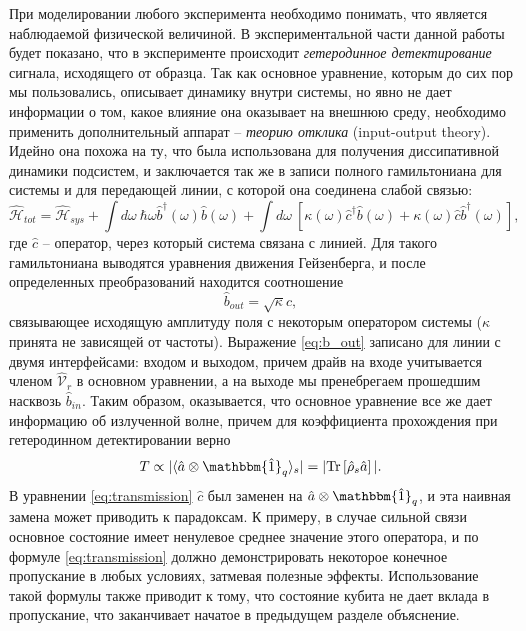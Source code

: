 \documentclass[12pt, twoside]{report}
\newcommand{\Tr}[1]{\text{Tr}\left[#1\right]}
\numberwithin{equation}{section}
\numberwithin{figure}{section}
\begin{document}
При моделировании любого эксперимента необходимо понимать, что является наблюдаемой физической величиной. В экспериментальной части данной работы будет показано, что в эксперименте происходит \textit{гетеродинное детектирование} сигнала, исходящего от образца. Так как основное уравнение, которым до сих пор мы пользовались, описывает динамику внутри системы, но явно не дает информации о том, какое влияние она оказывает на внешнюю среду, необходимо применить дополнительный аппарат -- \textit{теорию отклика}\cite{Bishop2010, clerk2010, gardiner1985} (input-output theory). Идейно она похожа на ту, что была использована для получения диссипативной динамики подсистем, и заключается так же в записи полного гамильтониана для системы и для передающей линии, с которой она соединена слабой связью:
$$\mathcal{\hat H}_{tot} = \mathcal{\hat H}_{sys} +\int d\omega\ \hbar \omega \hat b^\dag(\omega) \hat b(\omega) + \int d\omega\ [ \kappa(\omega) \hat c^{\dag} \hat b(\omega) + \kappa(\omega)\hat c \hat b^{\dag}(\omega)],	$$ 
где $\hat c$ -- оператор, через который система связана с линией. Для такого гамильтониана выводятся уравнения движения Гейзенберга, и после определенных преобразований находится соотношение 
\begin{equation}
\hat b_{out} = \sqrt{\kappa}\hat c,
\label{eq:b_out}
\end{equation} 
связывающее исходящую амплитуду поля с некоторым оператором системы ($\kappa$ принята не зависящей от частоты). Выражение \eqref{eq:b_out} записано для линии с двумя интерфейсами: входом и выходом, причем драйв на входе учитывается членом $\mathcal{\hat V}_r$ в основном уравнении, а на выходе мы пренебрегаем прошедшим насквозь $\hat b_{in}$. Таким образом, оказывается, что основное уравнение все же дает информацию об излученной волне, причем для коэффициента прохождения при гетеродинном детектировании верно\cite{Bishop2010}
\begin{equation}
T \propto | \langle \hat a \otimes \mathbbm{\hat 1}_q \rangle_{s} | = |\Tr{\hat \rho_s \hat a }|.
\label{eq:transmission}
\end{equation}
В уравнении \eqref{eq:transmission} $\hat c$ был заменен на $\hat a \otimes \mathbbm{\hat 1}_q $, и эта наивная замена может приводить к парадоксам. К примеру, в случае сильной связи основное состояние имеет ненулевое среднее значение этого оператора, и по формуле \eqref{eq:transmission} должно демонстрировать некоторое конечное пропускание в любых условиях, затмевая полезные эффекты. Использование такой формулы также приводит к тому, что состояние кубита не дает вклада в пропускание, что заканчивает начатое в предыдущем разделе объяснение.
\end{document}
